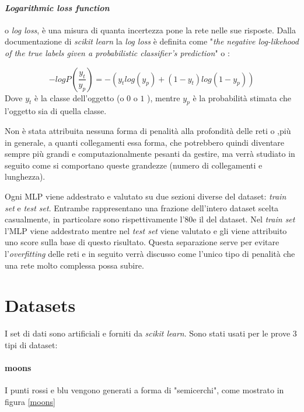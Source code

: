 \documentclass[12pt,a4paper]{report}
\begin{document}
\paragraph{\textit{Logarithmic loss function}} o \textit{log loss}, è una misura di quanta incertezza pone la rete nelle sue risposte. Dalla documentazione di \textit{scikit learn} la \textit{log loss} è definita come "\textit{the negative log-likehood of the true labels given a probabilistic classifier's prediction}" o :  

\begin{equation}
 -log P(\frac{y_{t}}{y_{p}}) = -(y_{t} log(y_{p}) + (1 - y_{t}) log(1 - y_{p}))
\end{equation}
Dove $y_{t}$ è la classe dell'oggetto (o $0$ o $1$ ), mentre $y_{p}$ è la probabilità stimata che l'oggetto sia di quella classe.

Non è stata attribuita nessuna forma di penalità alla profondità delle reti o ,più in generale, a quanti collegamenti essa forma, che potrebbero quindi diventare sempre più grandi e computazionalmente pesanti da gestire, ma verrà studiato in seguito come si comportano queste grandezze (numero di collegamenti e lunghezza). 

Ogni MLP viene addestrato e valutato su due sezioni diverse del dataset: \textit{train set} e \textit{test set}.
Entrambe rappresentano una frazione dell'intero dataset scelta casualmente, in particolare sono rispettivamente l'80\textdiscount e il \textdiscount del dataset.
Nel \textit{train set} l'MLP viene addestrato mentre nel \textit{test set} viene valutato e gli viene attribuito uno score sulla base di questo risultato. 
Questa separazione serve per evitare l'\textit{overfitting} delle reti e in seguito verrà discusso come l'unico tipo di penalità che una rete molto complessa possa subire.

\section{Datasets}

I set di dati sono artificiali e forniti da \textit{scikit learn}. 
Sono stati usati per le prove 3 tipi di dataset:

\paragraph{moons} I punti rossi e blu vengono generati a forma di "semicerchi", come mostrato in figura \ref{moons} 
\end{document}
